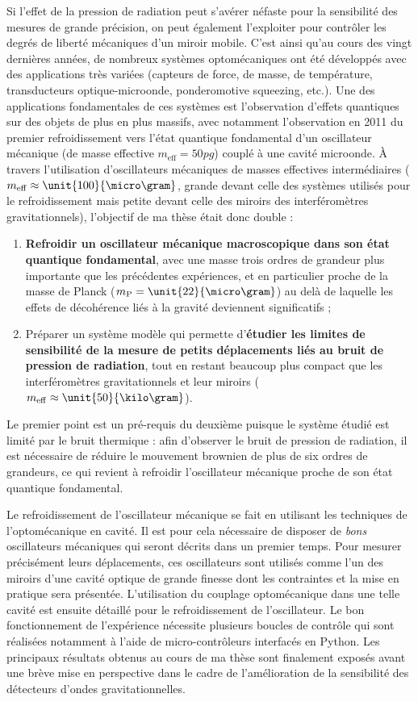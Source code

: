 \documentclass[12pt,a4paper]{article}
\begin{document}
Si l'effet de la pression de radiation peut s'avérer néfaste pour la sensibilité des mesures de grande précision, on peut également l'exploiter pour contrôler les degrés de liberté mécaniques d'un miroir mobile.
C'est ainsi qu'au cours des vingt dernières années, de nombreux systèmes optomécaniques ont été développés avec des applications très variées (capteurs de force, de masse, de température, transducteurs optique-microonde, ponderomotive squeezing, etc.).
Une des applications fondamentales de ces systèmes est l'observation d'effets quantiques sur des objets de plus en plus massifs, avec notamment l'observation en 2011 du premier refroidissement vers l'état quantique fondamental d'un oscillateur mécanique (de masse effective $m_\mathrm{eff} = \unit{50}{pg}$) couplé à une cavité microonde.
À travers l'utilisation d'oscillateurs mécaniques de masses effectives intermédiaires ($m_\mathrm{eff} \approx \unit{100}{\micro\gram}$, grande devant celle des systèmes utilisés pour le refroidissement mais petite devant celle des miroirs des interféromètres gravitationnels), l'objectif de ma thèse était donc double :
\begin{enumerate}
\item \textbf{Refroidir un oscillateur mécanique macroscopique dans son état quantique fondamental}, avec une masse trois ordres de grandeur plus importante que les précédentes expériences, et en particulier proche de la masse de Planck ($m_\mathrm{P}=\unit{22}{\micro\gram}$) au delà de laquelle les effets de décohérence liés à la gravité deviennent significatifs ;
\item Préparer un système modèle qui permette d'\textbf{étudier les limites de sensibilité de la mesure de petits déplacements liés au bruit de pression de radiation}, tout en restant beaucoup plus compact que les interféromètres gravitationnels et leur miroirs ($m_\mathrm{eff}\approx\unit{50}{\kilo\gram}$).
\end{enumerate}
Le premier point est un pré-requis du deuxième puisque le système étudié est limité par le bruit thermique : afin d'observer le bruit de pression de radiation, il est nécessaire de réduire le mouvement brownien de plus de six ordres de grandeurs, ce qui revient à refroidir l'oscillateur mécanique proche de son état quantique fondamental.

Le refroidissement de l'oscillateur mécanique se fait en utilisant les techniques de l'optomécanique en cavité.
Il est pour cela nécessaire de disposer de \textit{bons} oscillateurs mécaniques qui seront décrits dans un premier temps.
Pour mesurer précisément leurs déplacements, ces oscillateurs sont utilisés comme l'un des miroirs d'une cavité optique de grande finesse dont les contraintes et la mise en pratique sera présentée.
L'utilisation du couplage optomécanique dans une telle cavité est ensuite détaillé pour le refroidissement de l'oscillateur.
Le bon fonctionnement de l'expérience nécessite plusieurs boucles de contrôle qui sont réalisées notamment à l'aide de micro-contrôleurs interfacés en Python.
Les principaux résultats obtenus au cours de ma thèse sont finalement exposés avant une brève mise en perspective dans le cadre de l'amélioration de la sensibilité des détecteurs d'ondes gravitationnelles.
\end{document}

